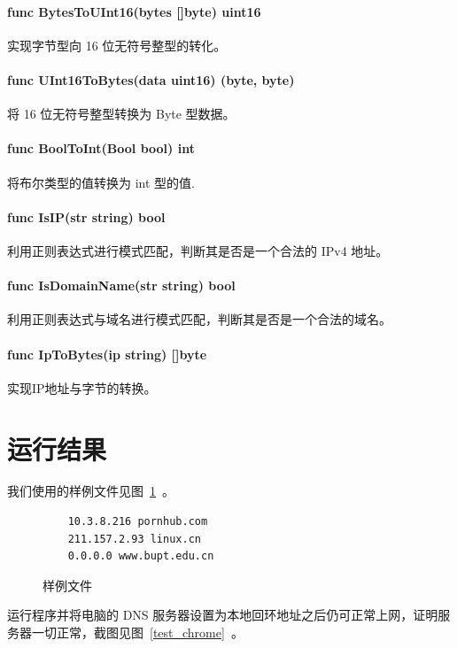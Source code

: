 \documentclass[blue,normal,cn]{elegantnote}
\begin{document}
\paragraph{func BytesToUInt16(bytes []byte) uint16} 实现字节型向 16 位无符号整型的转化。

\paragraph{func UInt16ToBytes(data uint16) (byte, byte)} 将 16 位无符号整型转换为 Byte 型数据。

\paragraph{func BoolToInt(Bool bool) int} 将布尔类型的值转换为 int 型的值.

\paragraph{func IsIP(str string) bool} 利用正则表达式进行模式匹配，判断其是否是一个合法的 IPv4 地址。

\paragraph{func IsDomainName(str string) bool} 利用正则表达式与域名进行模式匹配，判断其是否是一个合法的域名。

\paragraph{func IpToBytes(ip string) []byte} 实现IP地址与字节的转换。

\newpage

\section{运行结果}
我们使用的样例文件见图~\ref{test_example}~。
\begin{figure}[!htbp]
	\begin{lstlisting}
	10.3.8.216 pornhub.com
	211.157.2.93 linux.cn
	0.0.0.0 www.bupt.edu.cn
	\end{lstlisting}
	\caption{\label{test_example} 样例文件}
\end{figure}

运行程序并将电脑的 DNS 服务器设置为本地回环地址之后仍可正常上网，证明服务器一切正常，截图见图~\ref{test_chrome}~。
\end{document}

